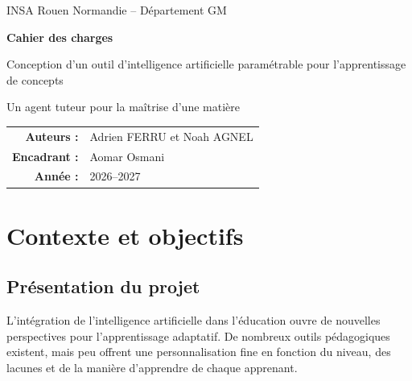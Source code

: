 \documentclass[11pt,a4paper]{article}
\begin{document}
\begin{titlepage}
\centering
{\large INSA Rouen Normandie -- Département GM\par}
\vspace{3cm}
{\Huge\bfseries Cahier des charges\par}
\vspace{1cm}
{\Large Conception d'un outil d'intelligence artificielle paramétrable pour l'apprentissage de concepts\par}
\vspace{1cm}
{\large Un agent tuteur pour la maîtrise d'une matière\par}
\vfill
\begin{tabular}{rl}
\textbf{Auteurs :} & Adrien FERRU et Noah AGNEL\\[0.4em]
\textbf{Encadrant :} & Aomar Osmani\\[0.4em]
\textbf{Année :} & 2026--2027\\
\end{tabular}
\vspace{2cm}
\end{titlepage}

\tableofcontents
\newpage

\section{Contexte et objectifs}

\subsection{Présentation du projet}

L'intégration de l'intelligence artificielle dans l'éducation ouvre de nouvelles perspectives pour l'apprentissage adaptatif. De nombreux outils pédagogiques existent, mais peu offrent une personnalisation fine en fonction du niveau, des lacunes et de la manière d'apprendre de chaque apprenant.
\end{document}
